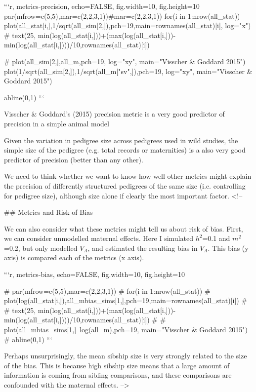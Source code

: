 ```{r, metrics-precision, echo=FALSE, fig.width=10, fig.height=10}
par(mfrow=c(5,5),mar=c(2,2,3,1))#mar=c(2,2,3,1))
for(i in 1:nrow(all_stat)){
 plot(all_stat[i,],1/sqrt(all_sim[2,]),pch=19,main=rownames(all_stat)[i], log="x")
 # text(25, min(log(all_stat[i,]))+(max(log(all_stat[i,]))-min(log(all_stat[i,])))/10,rownames(all_stat)[i])
}

# plot(all_sim[2,],all_m,pch=19, log="xy", main="Visscher & Goddard 2015")
plot(1/sqrt(all_sim[2,]),1/sqrt(all_m["sv",]),pch=19, log="xy", main="Visscher & Goddard 2015")

abline(0,1)
```

Visscher & Goddard's (2015) precision metric is a very good predictor of precision in a simple animal model

Given the variation in pedigree size across pedigrees used in wild studies, the simple size of the pedigree (e.g. total records or maternities) is a also very good predictor of precision (better than any other). 

We need to think whether we want to know how well other metrics might explain the precision of differently structured  pedigrees of the same size (i.e. controlling for pedigree size), although size alone if clearly the most important factor. 
<!-- 

## Metrics and Risk of Bias

We can also consider what these metrics might tell us about risk of bias. First, we can consider unmodelled maternal effects. Here I simulated  $h^2$=0.1 and $m^2$=0.2, but only modelled $V_A$, and estimated the resulting bias in $V_A$. This bias (y axis) is compared each of the metrics (x axis). 

```{r, metrics-bias, echo=FALSE, fig.width=10, fig.height=10}


# par(mfrow=c(5,5),mar=c(2,2,3,1))
# for(i in 1:nrow(all_stat)){
#  plot(log(all_stat[i,]),all_mbias_sims[1,],pch=19,main=rownames(all_stat)[i])
#  # text(25, min(log(all_stat[i,]))+(max(log(all_stat[i,]))-min(log(all_stat[i,])))/10,rownames(all_stat)[i])
# }
# plot(all_mbias_sims[1,]~log(all_m),pch=19, main="Visscher & Goddard 2015")
# abline(0,1)
```

Perhaps unsurprisingly, the mean sibship size is very strongly related to the size of the bias. This is because high sibship size means that a large amount of information is coming from sibling comparisons, and these comparisons are confounded with the maternal effects. 
 -->
